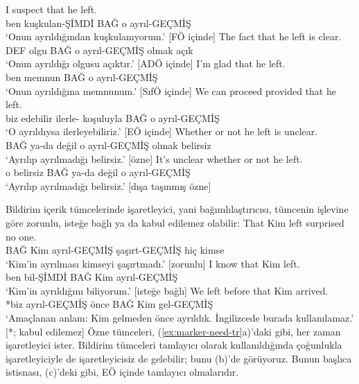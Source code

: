\ea \label{ex:content-funcs-tr}
    \ea \gll I suspect {\ob}that he left{\cb}.\\
        ben kuşkulan-ŞİMDİ BAĞ o ayrıl-GEÇMİŞ\\
    \glt `Onun ayrıldığından kuşkulanıyorum.' [FÖ içinde]
    \ex \gll The fact {\ob}that he left{\cb} is clear.\\
        DEF olgu BAĞ o ayrıl-GEÇMİŞ olmak açık\\
    \glt `Onun ayrıldığı olgusu açıktır.' [ADÖ içinde]
    \ex \gll I'm glad {\ob}that he left{\cb}.\\
        ben memnun BAĞ o ayrıl-GEÇMİŞ\\
    \glt `Onun ayrıldığına memnunum.' [SıfÖ içinde]
    \ex \gll We can proceed provided {\ob}that he left{\cb}.\\
        biz edebilir ilerle- koşuluyla BAĞ o ayrıl-GEÇMİŞ\\
    \glt `O ayrıldıysa ilerleyebiliriz.' [EÖ içinde]
    \ex \gll Whether or not he left is unclear.\\
        BAĞ ya-da değil o ayrıl-GEÇMİŞ olmak belirsiz\\
    \glt `Ayrılıp ayrılmadığı belirsiz.' [özne]
    \ex \gll It's unclear whether or not he left.\\
        o belirsiz BAĞ ya-da değil o ayrıl-GEÇMİŞ\\
    \glt `Ayrılıp ayrılmadığı belirsiz.' [dışa taşınmış özne]
    \z
\z

Bildirim içerik tümcelerinde işaretleyici, yani  bağımlılaştırıcısı, tümcenin işlevine göre zorunlu, isteğe bağlı ya da kabul edilemez olabilir:
\ea\label{ex:marker-need-tr}
    \ea \gll That Kim left surprised no one.\\
        BAĞ Kim ayrıl-GEÇMİŞ şaşırt-GEÇMİŞ hiç kimse\\
    \glt `Kim'in ayrılması kimseyi şaşırtmadı.' [zorunlu]
    \ex \gll I know that Kim left.\\
        ben bil-ŞİMDİ BAĞ Kim ayrıl-GEÇMİŞ\\
    \glt `Kim'in ayrıldığını biliyorum.' [isteğe bağlı]
    \ex \gll *We left before that Kim arrived.\\
        *biz ayrıl-GEÇMİŞ önce BAĞ Kim gel-GEÇMİŞ\\
    \glt `Amaçlanan anlam: Kim gelmeden önce ayrıldık. İngilizcede  burada kullanılamaz.' [*; kabul edilemez]
\z
\z
Özne tümceleri, (\ref{ex:marker-need-tr}a)'daki gibi, her zaman işaretleyici ister. Bildirim tümceleri tamlayıcı olarak kullanıldığında çoğunlukla işaretleyiciyle de işaretleyicisiz de gelebilir; bunu (b)'de görüyoruz. Bunun başlıca istisnası, (c)'deki gibi, EÖ içinde tamlayıcı olmalarıdır.

